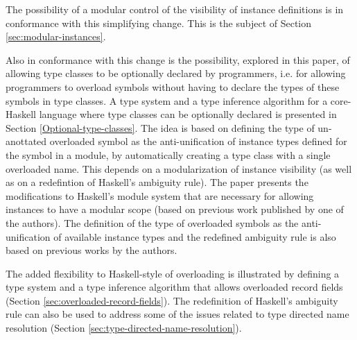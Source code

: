 The possibility of a modular control of the visibility of instance
definitions is in conformance with this simplifying change. This is
the subject of Section \ref{sec:modular-instances}.

Also in conformance with this change is the possibility, explored in
this paper, of allowing type classes to be optionally declared by
programmers, i.e. for allowing programmers to overload symbols without
having to declare the types of these symbols in type classes. A type
system and a type inference algorithm for a core-Haskell language
where type classes can be optionally declared is presented in Section
\ref{Optional-type-classes}.  The idea is based on defining the type
of un-anottated overloaded symbol as the anti-unification of instance
types defined for the symbol in a module, by automatically creating a
type class with a single overloaded name. This depends on a
modularization of instance visibility (as well as on a redefintion of
Haskell's ambiguity rule).  The paper presents the modifications to
Haskell's module system that are necessary for allowing instances to
have a modular scope (based on previous work published by one of the
authors). The definition of the type of overloaded symbols as the
anti-unification of available instance types and the redefined
ambiguity rule is also based on previous works by the authors.

The added flexibility to Haskell-style of overloading is illustrated
by defining a type system and a type inference algorithm that allows
overloaded record fields (Section
\ref{sec:overloaded-record-fields}). The redefinition of Haskell's
ambiguity rule can also be used to address some of the issues related
to type directed name resolution (Section
\ref{sec:type-directed-name-resolution}).

